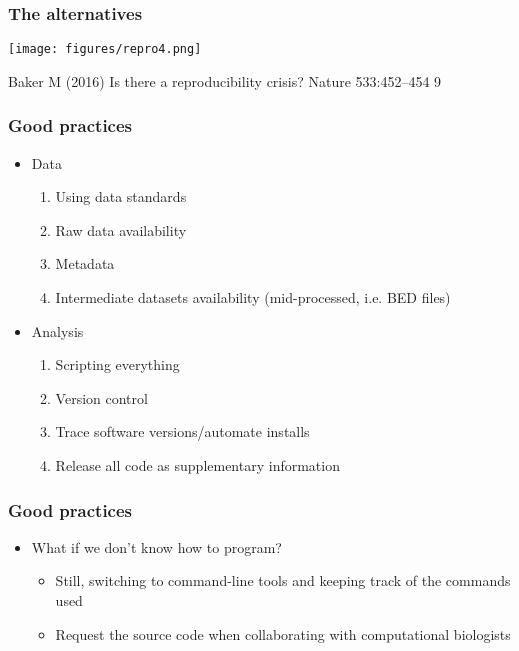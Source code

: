 \documentclass{beamer}
\begin{document}
\begin{frame}
  \frametitle{The alternatives}
\centering
\texttt{[image: figures/repro4.png]}

{\tiny Baker M (2016) Is there a reproducibility crisis? Nature 533:452–454 9}
\end{frame}



\begin{frame}
  \frametitle{Good practices}
  \begin{itemize}
  \item Data
    \begin{enumerate}
    \item Using data standards
    \item Raw data availability
    \item Metadata
    \item Intermediate datasets availability (mid-processed, i.e. BED files)
    \end{enumerate}
  \item Analysis
    \begin{enumerate}
    \item Scripting everything
    \item Version control
    \item Trace software versions/automate installs
    \item Release all code as supplementary information
    \end{enumerate}
  \end{itemize}
\end{frame}



\begin{frame}
  \frametitle{Good practices}
 \begin{itemize}
  \item What if we don't know how to program?
    \begin{itemize}
    \item Still, switching to command-line tools and keeping track of the commands used
    \item Request the source code when collaborating with computational biologists
    \end{itemize}
  \end{itemize}
\end{frame}
\end{document}

